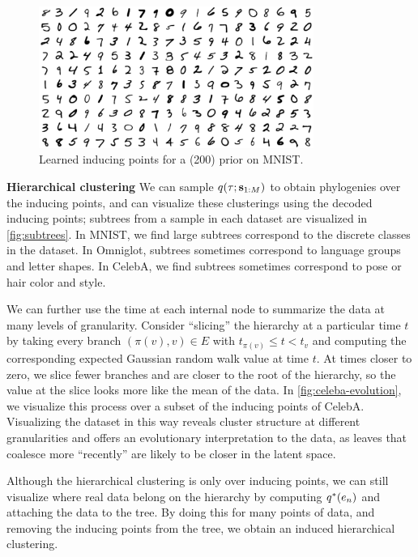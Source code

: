 \begin{figure}[t]
\centering
\includegraphics[width=0.8\textwidth]{img/loracs/mnist/mnist-inducing-points.png}
\caption{Learned inducing points for a \acronym(200) prior on MNIST.}
\label{fig:mnist-inducing}
\end{figure}

\textbf{Hierarchical clustering}
We can sample
$q(\tau ; \mathbf{s}_{1:M})$ to obtain
phylogenies
over the inducing points,
and can visualize these clusterings
using the decoded inducing points;
subtrees from a sample in each dataset
are visualized in \autoref{fig:subtrees}.
In MNIST, we find large subtrees
correspond to the discrete classes
in the dataset. In Omniglot,
subtrees sometimes correspond to language groups
and letter shapes. In CelebA,
we find subtrees sometimes correspond
to pose or hair color and style.

We can further use the time at each internal node
to summarize the data at many levels of granularity.
Consider ``slicing'' the hierarchy
at a particular time $t$ by
taking every branch $(\pi(v), v) \in E$ with $t_{\pi(v)} \leq t < t_v$
and computing the corresponding expected Gaussian random walk value at time $t$.
At times closer to zero, we slice
fewer branches and are closer to the root
of the hierarchy, so the value at the slice
looks more like the mean of the data.
In \autoref{fig:celeba-evolution}, 
we visualize this process over a subset
of the inducing points of CelebA.
Visualizing the dataset in this way
reveals cluster structure at 
different granularities
and offers an evolutionary interpretation
to the data, as leaves that coalesce 
more ``recently'' are likely to be closer in 
the latent space.

Although the hierarchical clustering is only
over inducing points, we can still visualize
where real data belong on the hierarchy
by computing $q^*(e_n)$ and
attaching the data to the tree.
By doing this for many points of data, and removing
the inducing points from the tree,
we obtain an induced hierarchical clustering.


